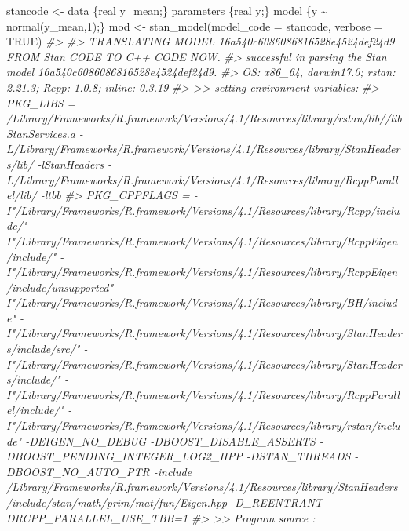 \documentclass[
  10pt,
  italian,
  a4paper,
  extrafontsizes,onecolumn,openright
  ]{memoir}
\newenvironment{Shaded}{\begin{snugshade}}{\end{snugshade}}
\newcommand{\AttributeTok}[1]{\textcolor[rgb]{0.77,0.63,0.00}{#1}}
\newcommand{\CommentTok}[1]{\textcolor[rgb]{0.56,0.35,0.01}{\textit{#1}}}
\newcommand{\ConstantTok}[1]{\textcolor[rgb]{0.00,0.00,0.00}{#1}}
\newcommand{\FunctionTok}[1]{\textcolor[rgb]{0.00,0.00,0.00}{#1}}
\newcommand{\NormalTok}[1]{#1}
\newcommand{\OtherTok}[1]{\textcolor[rgb]{0.56,0.35,0.01}{#1}}
\newcommand{\StringTok}[1]{\textcolor[rgb]{0.31,0.60,0.02}{#1}}
\begin{document}
\begin{Shaded}
\begin{Highlighting}[]
\NormalTok{stancode }\OtherTok{\textless{}{-}} \StringTok{\textquotesingle{}data \{real y\_mean;\} parameters \{real y;\} model \{y \textasciitilde{} normal(y\_mean,1);\}\textquotesingle{}}
\NormalTok{mod }\OtherTok{\textless{}{-}} \FunctionTok{stan\_model}\NormalTok{(}\AttributeTok{model\_code =}\NormalTok{ stancode, }\AttributeTok{verbose =} \ConstantTok{TRUE}\NormalTok{)}
\CommentTok{\#\textgreater{} }
\CommentTok{\#\textgreater{} TRANSLATING MODEL \textquotesingle{}16a540c6086086816528e4524def24d9\textquotesingle{} FROM Stan CODE TO C++ CODE NOW.}
\CommentTok{\#\textgreater{} successful in parsing the Stan model \textquotesingle{}16a540c6086086816528e4524def24d9\textquotesingle{}.}
\CommentTok{\#\textgreater{} OS: x86\_64, darwin17.0; rstan: 2.21.3; Rcpp: 1.0.8; inline: 0.3.19 }
\CommentTok{\#\textgreater{}  \textgreater{}\textgreater{} setting environment variables: }
\CommentTok{\#\textgreater{} PKG\_LIBS =  \textquotesingle{}/Library/Frameworks/R.framework/Versions/4.1/Resources/library/rstan/lib//libStanServices.a\textquotesingle{} {-}L\textquotesingle{}/Library/Frameworks/R.framework/Versions/4.1/Resources/library/StanHeaders/lib/\textquotesingle{} {-}lStanHeaders {-}L\textquotesingle{}/Library/Frameworks/R.framework/Versions/4.1/Resources/library/RcppParallel/lib/\textquotesingle{} {-}ltbb}
\CommentTok{\#\textgreater{} PKG\_CPPFLAGS =   {-}I"/Library/Frameworks/R.framework/Versions/4.1/Resources/library/Rcpp/include/"  {-}I"/Library/Frameworks/R.framework/Versions/4.1/Resources/library/RcppEigen/include/"  {-}I"/Library/Frameworks/R.framework/Versions/4.1/Resources/library/RcppEigen/include/unsupported"  {-}I"/Library/Frameworks/R.framework/Versions/4.1/Resources/library/BH/include" {-}I"/Library/Frameworks/R.framework/Versions/4.1/Resources/library/StanHeaders/include/src/"  {-}I"/Library/Frameworks/R.framework/Versions/4.1/Resources/library/StanHeaders/include/"  {-}I"/Library/Frameworks/R.framework/Versions/4.1/Resources/library/RcppParallel/include/"  {-}I"/Library/Frameworks/R.framework/Versions/4.1/Resources/library/rstan/include" {-}DEIGEN\_NO\_DEBUG  {-}DBOOST\_DISABLE\_ASSERTS  {-}DBOOST\_PENDING\_INTEGER\_LOG2\_HPP  {-}DSTAN\_THREADS  {-}DBOOST\_NO\_AUTO\_PTR  {-}include \textquotesingle{}/Library/Frameworks/R.framework/Versions/4.1/Resources/library/StanHeaders/include/stan/math/prim/mat/fun/Eigen.hpp\textquotesingle{}  {-}D\_REENTRANT {-}DRCPP\_PARALLEL\_USE\_TBB=1 }
\CommentTok{\#\textgreater{}  \textgreater{}\textgreater{} Program source :}

\end{Highlighting}
\end{Shaded}
\end{document}
